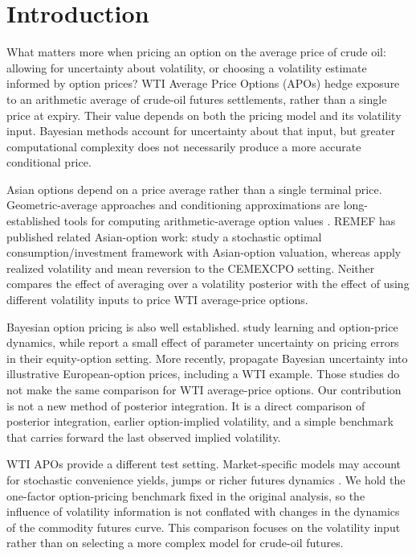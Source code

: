 \section{Introduction}\label{sec:short_intro}

What matters more when pricing an option on the average price of crude
oil: allowing for uncertainty about volatility, or choosing a
volatility estimate informed by option prices? WTI Average Price
Options (APOs) hedge exposure to an arithmetic average of crude-oil
futures settlements, rather than a single price at expiry.
Their value depends on both the pricing model and its volatility
input. Bayesian methods account for uncertainty about that input,
but greater computational complexity does not necessarily produce
a more accurate conditional price.

Asian options depend on a price average rather than a single terminal
price. Geometric-average approaches and conditioning approximations
are long-established tools for computing arithmetic-average
option values \citep{kemnavorst1990,curran1994}. REMEF has
published related Asian-option work: \citet{matiasgonzalez2019}
study a stochastic optimal consumption/investment framework with
Asian-option valuation, whereas \citet{ortizjimenez2026} apply
realized volatility and mean reversion to the CEMEXCPO setting.
Neither compares the effect of averaging over a volatility posterior with the effect of using different volatility inputs to price WTI average-price options.

Bayesian option pricing is also well established. \citet{guidolin2003}
study learning and option-price dynamics, while
\citet{romboutsstentoft2014} report a small effect of parameter
uncertainty on pricing errors in their equity-option setting.
More recently, \citet{sagorbooneghanam2026} propagate Bayesian
uncertainty into illustrative European-option prices, including
a WTI example. Those studies do not make the same comparison for WTI
average-price options. Our contribution is not a new method of
posterior integration. It is a direct comparison of posterior
integration, earlier option-implied volatility, and a simple
benchmark that carries forward the last observed implied volatility.

WTI APOs provide a different test setting. Market-specific
models may account for stochastic convenience yields, jumps
or richer futures dynamics \citep{schwartz1997,shirayatakahashi2011,ewaldwu2023}.
We hold the one-factor option-pricing benchmark fixed in
the original analysis, so the influence of volatility
information is not conflated with changes in the dynamics
of the commodity futures curve. This comparison focuses on the volatility input rather than
on selecting a more complex model for crude-oil futures.

